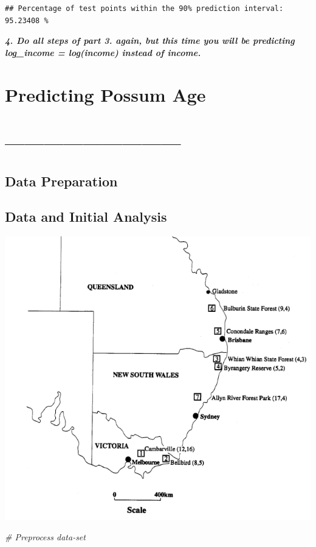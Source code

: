 \documentclass[
]{article}
\newenvironment{Shaded}{\begin{snugshade}}{\end{snugshade}}
\newcommand{\CommentTok}[1]{\textcolor[rgb]{0.56,0.35,0.01}{\textit{#1}}}
\begin{document}
\begin{verbatim}
## Percentage of test points within the 90% prediction interval: 95.23408 %
\end{verbatim}

\textbf{\emph{4. Do all steps of part 3. again, but this time you will
be predicting log\_income = log(income) instead of income.}}

\section{Predicting Possum Age}\label{predicting-possum-age}

\section{---------------------------}\label{section}

\subsection{Data Preparation}\label{data-preparation-2}

\subsection{Data and Initial Analysis}\label{data-and-initial-analysis}

\begin{center}\includegraphics[width=0.7\linewidth]{../images/possum_age_plot} \end{center}

\begin{Shaded}
\begin{Highlighting}[]
\CommentTok{\# Preprocess data{-}set}
\end{Highlighting}
\end{Shaded}
\end{document}
